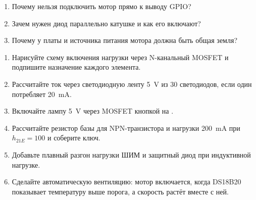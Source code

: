 \begin{selfcheck}
\begin{enumerate}
  \item Почему нельзя подключить мотор прямо к выводу GPIO?
  \item Зачем нужен диод параллельно катушке и как его включают?
  \item Почему у платы и источника питания мотора должна быть общая земля?
\end{enumerate}
\end{selfcheck}

\begin{tasks}
\begin{enumerate}
\item {} Нарисуйте схему включения нагрузки через N-канальный MOSFET и подпишите назначение каждого элемента.
\item {} Рассчитайте ток через светодиодную ленту \SI{5}{V} из 30 светодиодов, если один потребляет \SI{20}{mA}.
\item {} Включайте лампу \SI{5}{V} через MOSFET кнопкой на .
\item {} Рассчитайте резистор базы для NPN-транзистора и нагрузки \SI{200}{mA} при $h_{21E}=100$ и соберите ключ.
\item {} Добавьте плавный разгон нагрузки ШИМ и защитный диод при индуктивной нагрузке.
\item {} Сделайте автоматическую вентиляцию: мотор включается, когда DS18B20 показывает температуру выше порога, а скорость растёт вместе с ней.
\end{enumerate}
\end{tasks}

